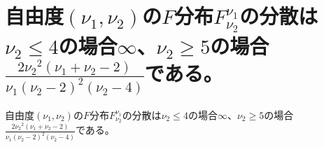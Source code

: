     \section{自由度\texorpdfstring{$(\nu_1,\nu_2)$}{(ν1,ν2)}の\texorpdfstring{$F$}{F}分布\texorpdfstring{$F_{\nu_2}^{\nu_1}$}{F\_ν2\string^ν1}の分散は\texorpdfstring{$\nu_2 \leq 4$}{ν2<4}の場合\texorpdfstring{$\infty$}{∞}、\texorpdfstring{$\nu_2 \geq 5$}{ν2≧5}の場合\texorpdfstring{$\displaystyle \frac{2{\nu_2}^2(\nu_1+\nu_2-2)}{\nu_1(\nu_2-2)^2(\nu_2-4)}$}{(2(ν2)\string^2 (ν1+ν2-2))/(ν1(ν2-2)\string^2 (ν2-4))}である。}
        \begin{shadebox}
            自由度$(\nu_1,\nu_2)$の$F$分布$F_{\nu_2}^{\nu_1}$の分散は$\nu_2 \leq 4$の場合$\infty$、$\nu_2 \geq 5$の場合$\displaystyle \frac{2{\nu_2}^2(\nu_1+\nu_2-2)}{\nu_1(\nu_2-2)^2(\nu_2-4)}$である。
        \end{shadebox}
